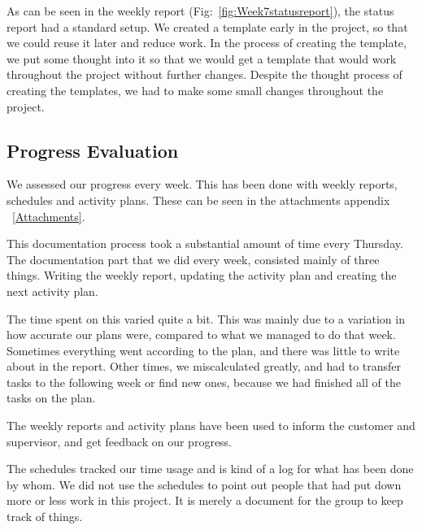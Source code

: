     As can be seen in the weekly report (Fig:~\ref{fig:Week7statusreport}), the status report had a standard setup. We created a template early in the project, so that we could reuse it later and reduce work. In the process of creating the template, we put some thought into it so that we would get a template that would work throughout the project without further changes. Despite the thought process of creating the templates, we had to make some small changes throughout the project.
    
       \subsection{Progress Evaluation}\label{Progress Evaluation}
    We assessed our progress every week. This has been done with weekly reports, schedules and activity plans. These can be seen in the attachments appendix ~\ref{Attachments}.
    
    This documentation process took a substantial amount of time every Thursday. The documentation part that we did every week, consisted mainly of three things. Writing the weekly report, updating the activity plan and creating the next activity plan. 
    
    The time spent on this varied quite a bit. This was mainly due to a variation in how accurate our plans were, compared to what we managed to do that week. Sometimes everything went according to the plan, and there was little to write about in the report. Other times, we miscalculated greatly, and had to transfer tasks to the following week or find new ones, because we had finished all of the tasks on the plan.
    
    The weekly reports and activity plans have been used to inform the customer and supervisor, and get feedback on our progress.
    
    The schedules tracked our time usage and is kind of a log for what has been done by whom. We did not use the schedules to point out people that had put down more or less work in this project. It is merely a document for the group to keep track of things. 
    
    
